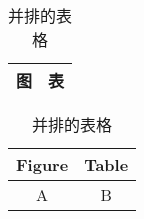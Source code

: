 \documentclass[nofonts]{ctexart}
\begin{document}
\begin{table}
	\centering
	\caption{并排的表格}
	\begin{tabular}{|c|c|}
		\hline
		图	& 表	\\
		\hline
	\end{tabular}
	\qquad
	\begin{tabular}{|c|c|}
		\hline
		Figure	& Table	\\
		\hline
		A		& B		\\
		\hline
	\end{tabular}
\end{table}
\end{document}
